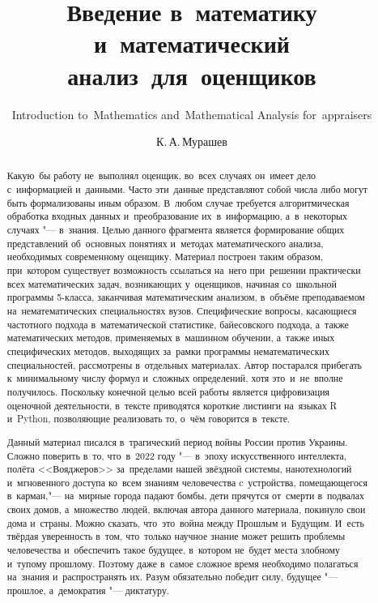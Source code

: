 \documentclass[]{scrartcl}
\title{Введение в~математику и~математический анализ~для~оценщиков}
\subtitle{\foreignlanguage{English}{Introduction to~Mathematics and~Mathematical Analysis for~appraisers}}
\author{К.\,А.\,Мурашев}
\begin{document}
\maketitle

\begin{abstract}
	Какую~бы работу не~выполнял оценщик, во~всех случаях он~имеет дело с~информацией и~данными. Часто эти~данные представляют собой числа либо могут быть формализованы иным образом. В~любом случае требуется алгоритмическая обработка входных данных и~преобразование их~в~информацию, а~в~некоторых случаях "--- в~знания. Целью данного фрагмента является формирование общих представлений об~основных понятиях и~методах математического анализа, необходимых современному оценщику. Материал построен таким образом, при~котором существует возможность ссылаться на~него при~решении практически всех математических задач, возникающих у~оценщиков, начиная со~школьной программы 5-класса, заканчивая математическим анализом, в~объёме преподаваемом на~нематематических специальностях вузов. Специфические вопросы, касающиеся частотного подхода в~математической статистике, байесовского подхода, а~также математических методов, применяемых в~машинном обучении, а~также иных специфических методов, выходящих за~рамки программы нематематических специальностей, рассмотрены в~отдельных материалах.  Автор постарался прибегать к~минимальному числу формул и~сложных определений, хотя это~и~не~вполне получилось. Поскольку конечной целью всей работы является цифровизация оценочной деятельности, в~тексте приводятся короткие листинги на~языках R и~Python, позволяющие реализовать то, о~чём говорится в~тексте.
	
	Данный материал писался в~трагический период войны России против Украины. Сложно поверить в~то, что~в~2022 году "--- в~эпоху искусственного интеллекта, полёта <<Вояджеров>> за~пределами нашей звёздной системы, нанотехнологий и~мгновенного доступа ко~всем знаниям человечества c~устройства, помещающегося в~карман,"--- на~мирные города падают бомбы, дети прячутся от~смерти в~подвалах своих домов, а~множество людей, включая автора данного материала, покинуло свои дома и~страны.  Можно сказать, что~это~война между Прошлым и~Будущим. И~есть твёрдая уверенность в~том, что~только научное знание может решить проблемы человечества и~обеспечить такое будущее, в~котором не~будет места злобному и~тупому прошлому. Поэтому даже в~самое сложное время необходимо полагаться на~знания и~распространять их. Разум обязательно победит силу, будущее "--- прошлое, а~демократия "--- диктатуру. 
	

\end{abstract}
\end{document}
